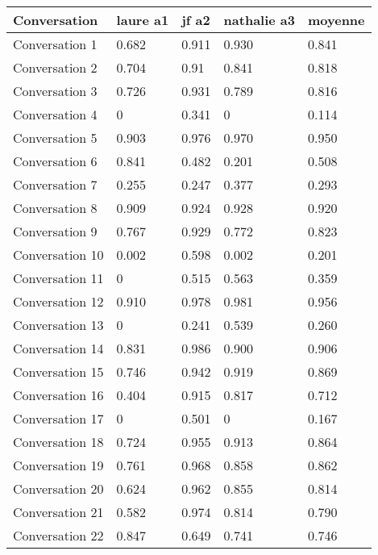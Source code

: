 \begin{table}[]
\begin{tabular}{|l|l|l|l|l|}
\hline
Conversation     & laure a1 & jf a2 & nathalie a3 & moyenne \\ \hline
Conversation 1   & 0.682    & 0.911 & 0.930       & 0.841   \\ \hline
Conversation 2   & 0.704    & 0.91  & 0.841       & 0.818   \\ \hline
Conversation 3   & 0.726    & 0.931 & 0.789       & 0.816   \\ \hline
Conversation 4   & 0        & 0.341 & 0           & 0.114   \\ \hline
Conversation 5   & 0.903    & 0.976 & 0.970       & 0.950   \\ \hline
Conversation 6   & 0.841    & 0.482 & 0.201       & 0.508   \\ \hline
Conversation 7   & 0.255    & 0.247 & 0.377       & 0.293   \\ \hline
Conversation 8   & 0.909    & 0.924 & 0.928       & 0.920   \\ \hline
Conversation 9   & 0.767    & 0.929 & 0.772       & 0.823   \\ \hline
Conversation 10  & 0.002    & 0.598 & 0.002       & 0.201   \\ \hline
Conversation 11  & 0        & 0.515 & 0.563       & 0.359   \\ \hline
Conversation 12  & 0.910    & 0.978 & 0.981       & 0.956   \\ \hline
Conversation 13  & 0        & 0.241 & 0.539       & 0.260   \\ \hline
Conversation 14  & 0.831    & 0.986 & 0.900       & 0.906   \\ \hline
Conversation 15  & 0.746    & 0.942 & 0.919       & 0.869   \\ \hline
Conversation 16  & 0.404    & 0.915 & 0.817       & 0.712   \\ \hline
Conversation 17  & 0        & 0.501 & 0           & 0.167   \\ \hline
Conversation 18  & 0.724    & 0.955 & 0.913       & 0.864   \\ \hline
Conversation 19  & 0.761    & 0.968 & 0.858       & 0.862   \\ \hline
Conversation 20  & 0.624    & 0.962 & 0.855       & 0.814   \\ \hline
Conversation 21  & 0.582    & 0.974 & 0.814       & 0.790   \\ \hline
Conversation 22  & 0.847    & 0.649 & 0.741       & 0.746   \\ \hline

\end{tabular}
\end{table}
